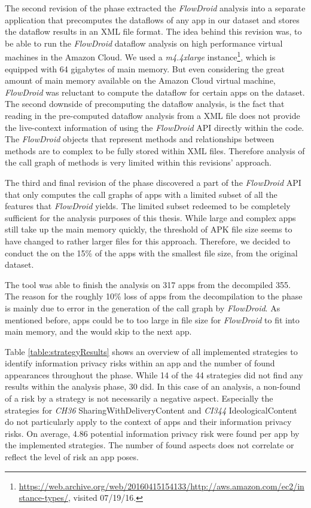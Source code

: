 The second revision of the \sca phase extracted the \textit{FlowDroid} analysis into a separate application that precomputes the dataflows of any app in our dataset and stores the dataflow results in an \acs{XML} file format.
The idea behind this revision was, to be able to run the \textit{FlowDroid} dataflow analysis on high performance virtual machines in the Amazon Cloud.
We used a \textit{m4.4xlarge} instance\footnote{\raggedright \url{https://web.archive.org/web/20160415154133/http://aws.amazon.com/ec2/instance-types/}, visited 07/19/16.}, which is equipped with 64 gigabytes of main memory.
But even considering the great amount of main memory available on the Amazon Cloud virtual machine, \textit{FlowDroid} was reluctant to compute the dataflow for certain apps on the dataset.
The second downside of precomputing the dataflow analysis, is the fact that reading in the pre-computed dataflow analysis from a XML file does not provide the live-context information of using the \textit{FlowDroid} API directly within the code.
The \textit{FlowDroid} objects that represent methods and relationships between methods are to complex to be fully stored within XML files.
Therefore analysis of the call graph of methods is very limited within this revisions' approach.

The third and final revision of the \sca phase discovered a part of the \textit{FlowDroid} API that only computes the call graphs of apps with a limited subset of all the features that \textit{FlowDroid} yields.
The limited subset redeemed to be completely sufficient for the analysis purposes of this thesis.
While large and complex apps still take up the main memory quickly, the threshold of APK file size seems to have changed to rather larger files for this approach.
Therefore, we decided to conduct the \sca on the 15\% of the apps with the smallest file size, from the original dataset.

The \sca tool was able to finish the analysis on 317 apps from the decompiled 355.
The reason for the roughly 10\% loss of apps from the decompilation to the \sca phase is mainly due to error in the generation of the call graph by \textit{FlowDroid}.
As mentioned before, apps could be to too large in file size for \textit{FlowDroid} to fit into main memory, and the \sca would skip to the next app.

Table \ref{table:strategyResults} shows an overview of all implemented strategies to identify information privacy risks within an app and the number of found appearances throughout the \sca phase.
While 14 of the 44 strategies did not find any \ipr results within the analysis phase, 30 did.
In this case of an \ipr analysis, a non-found of a risk by a strategy is not necessarily a negative aspect.
Especially the strategies for \textit{CH36} SharingWithDeliveryContent and \textit{CI344} IdeologicalContent do not particularly apply to the context of \mH apps and their information privacy risks.
On average, 4.86 potential information privacy risk were found per app by the implemented strategies.
The number of found \ipr aspects does not correlate or reflect the level of risk an app poses.

